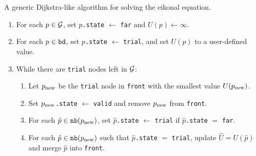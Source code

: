 \documentclass{article}
\begin{document}
\begin{algorithm}
  \caption{A generic Dijkstra-like algorithm for solving the eikonal
    equation.}\label{alg:dijkstra-like}
  \begin{enumerate}[nolistsep]
  \item For each $p \in \mathcal{G}$, set $p$\texttt{.state} $\gets$
    \texttt{far} and $U(p) \gets \infty$.
  \item For each $p \in \texttt{bd}$, set $p$\texttt{.state} $\gets$
    \texttt{trial}, and set $U(p)$ to a user-defined value.
  \item While there are \texttt{trial} nodes left in $\mathcal{G}$:
    \begin{enumerate}[nolistsep]
    \item Let $p_{\operatorname{new}}$ be the \texttt{trial} node in \texttt{front}
      with the smallest value $U(p_{\operatorname{new}})$.\label{enum:get-node}
    \item Set $p_{\operatorname{new}}$\texttt{.state} $\gets$ \texttt{valid} and remove
      $p_{\operatorname{new}}$ from \texttt{front}.
    \item For each $\hat{p} \in \texttt{nb}(p_{\operatorname{new}})$, set
      $\hat{p}$\texttt{.state} $\gets$ \texttt{trial} if
      $\hat{p}$\texttt{.state} $=$ \texttt{far}.\label{enum:set-trial}
    \item For each $\hat{p} \in \texttt{nb}(p_{\operatorname{new}})$ such that
      $\hat{p}$\texttt{.state} $=$ \texttt{trial}, update
      $\hat{U} = U(\hat{p})$ and merge $\hat{p}$ into
      \texttt{front}.\label{enum:update-U}
    \end{enumerate}
  \end{enumerate}
\end{algorithm}
\end{document}
